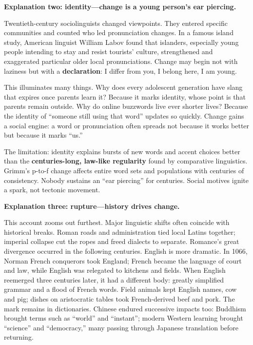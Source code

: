 \textbf{Explanation two: identity---change is a young person's ear piercing.}

Twentieth-century sociolinguists changed viewpoints. They entered specific communities and counted who led pronunciation changes. In a famous island study, American linguist William Labov found that islanders, especially young people intending to stay and resist tourists' culture, strengthened and exaggerated particular older local pronunciations. Change may begin not with laziness but with a \textbf{declaration}: I differ from you, I belong here, I am young.

This illuminates many things. Why does every adolescent generation have slang that expires once parents learn it? Because it marks identity, whose point is that parents remain outside. Why do online buzzwords live ever shorter lives? Because the identity of ``someone still using that word'' updates so quickly. Change gains a social engine: a word or pronunciation often spreads not because it works better but because it marks ``us.''

The limitation: identity explains bursts of new words and accent choices better than the \textbf{centuries-long, law-like regularity} found by comparative linguistics. Grimm's p-to-f change affects entire word sets and populations with centuries of consistency. Nobody sustains an ``ear piercing'' for centuries. Social motives ignite a spark, not tectonic movement.

\textbf{Explanation three: rupture---history drives change.}

This account zooms out furthest. Major linguistic shifts often coincide with historical breaks. Roman roads and administration tied local Latins together; imperial collapse cut the ropes and freed dialects to separate. Romance's great divergence occurred in the following centuries. English is more dramatic. In 1066, Norman French conquerors took England; French became the language of court and law, while English was relegated to kitchens and fields. When English reemerged three centuries later, it had a different body: greatly simplified grammar and a flood of French words. Field animals kept English names, cow and pig; dishes on aristocratic tables took French-derived beef and pork. The mark remains in dictionaries. Chinese endured successive impacts too: Buddhism brought terms such as ``world'' and ``instant''; modern Western learning brought ``science'' and ``democracy,'' many passing through Japanese translation before returning.


